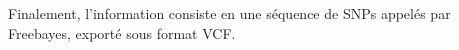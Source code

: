 Finalement, l'information consiste en une séquence de SNPs appelés par Freebayes, exporté sous format VCF.


